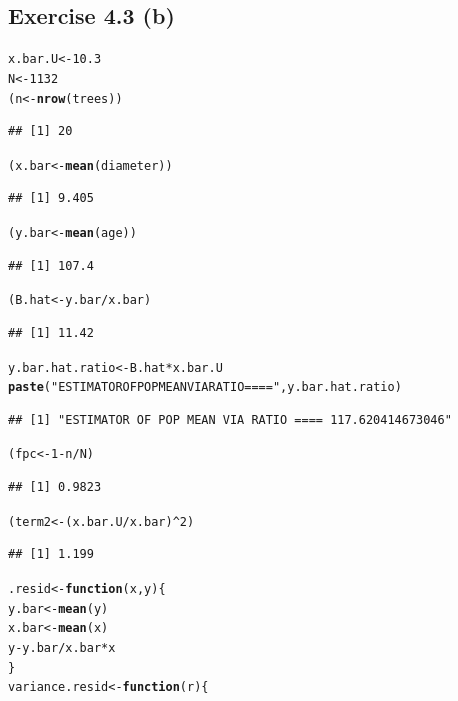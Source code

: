 \documentclass{article}\usepackage{graphicx, color}
\makeatletter
\newcommand{\hlfunctioncall}[1]{\textcolor[rgb]{0.501960784313725,0,0.329411764705882}{\textbf{#1}}}%
\newcommand{\hlstring}[1]{\textcolor[rgb]{0.6,0.6,1}{#1}}%
\newenvironment{kframe}{%
 \def\at@end@of@kframe{}%
 \ifinner\ifhmode%
  \def\at@end@of@kframe{\end{minipage}}%
  \begin{minipage}{\columnwidth}%
 \fi\fi%
 \def\FrameCommand##1{\hskip\@totalleftmargin \hskip-\fboxsep
 \colorbox{shadecolor}{##1}\hskip-\fboxsep
     \hskip-\linewidth \hskip-\@totalleftmargin \hskip\columnwidth}%
 \MakeFramed {\advance\hsize-\width
   \@totalleftmargin\z@ \linewidth\hsize
   \@setminipage}}%
 {\par\unskip\endMakeFramed%
 \at@end@of@kframe}
\newenvironment{knitrout}{}{} %
\makeatother
\begin{document}
\subsection*{Exercise 4.3 (b)}
\begin{knitrout}
\color{fgcolor}\begin{kframe}
\begin{alltt}
x.bar.U <- 10.3
N <- 1132
(n <- \hlfunctioncall{nrow}(trees))
\end{alltt}
\begin{verbatim}
## [1] 20
\end{verbatim}
\begin{alltt}
(x.bar <- \hlfunctioncall{mean}(diameter))
\end{alltt}
\begin{verbatim}
## [1] 9.405
\end{verbatim}
\begin{alltt}
(y.bar <- \hlfunctioncall{mean}(age))
\end{alltt}
\begin{verbatim}
## [1] 107.4
\end{verbatim}
\begin{alltt}
(B.hat <- y.bar/x.bar)
\end{alltt}
\begin{verbatim}
## [1] 11.42
\end{verbatim}
\begin{alltt}
y.bar.hat.ratio <- B.hat * x.bar.U
\hlfunctioncall{paste}(\hlstring{"ESTIMATOR OF POP MEAN VIA RATIO ===="}, y.bar.hat.ratio)
\end{alltt}
\begin{verbatim}
## [1] "ESTIMATOR OF POP MEAN VIA RATIO ==== 117.620414673046"
\end{verbatim}
\begin{alltt}
(fpc <- 1 - n/N)
\end{alltt}
\begin{verbatim}
## [1] 0.9823
\end{verbatim}
\begin{alltt}
(term2 <- (x.bar.U/x.bar)^2)
\end{alltt}
\begin{verbatim}
## [1] 1.199
\end{verbatim}
\begin{alltt}
.resid <- \hlfunctioncall{function}(x, y) \{
    y.bar <- \hlfunctioncall{mean}(y)
    x.bar <- \hlfunctioncall{mean}(x)
    y - y.bar/x.bar * x
\}
variance.resid <- \hlfunctioncall{function}(r) \{

\end{alltt}
\end{kframe}
\end{knitrout}
\end{document}
